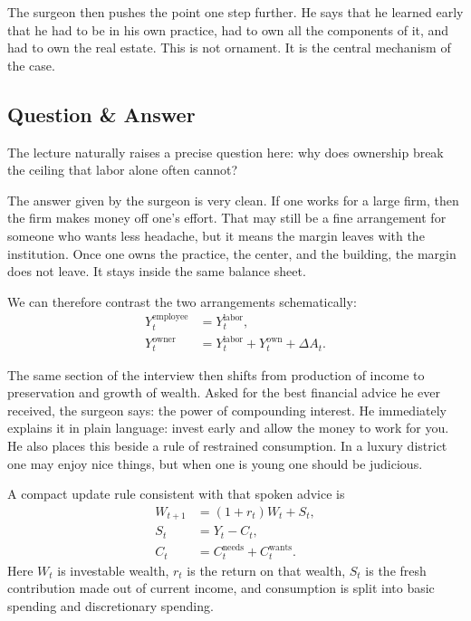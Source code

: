 The surgeon then pushes the point one step further. He says that he learned early that he had to be in his own practice, had to own all the components of it, and had to own the real estate. This is not ornament. It is the central mechanism of the case.

\subsection{Question \& Answer}

The lecture naturally raises a precise question here: why does ownership break the ceiling that labor alone often cannot?

The answer given by the surgeon is very clean. If one works for a large firm, then the firm makes money off one's effort. That may still be a fine arrangement for someone who wants less headache, but it means the margin leaves with the institution. Once one owns the practice, the center, and the building, the margin does not leave. It stays inside the same balance sheet.

We can therefore contrast the two arrangements schematically:
\begin{align}
Y_t^{\text{employee}} &= Y_t^{\text{labor}},\\
Y_t^{\text{owner}} &= Y_t^{\text{labor}} + Y_t^{\text{own}} + \Delta A_t.
\end{align}

The same section of the interview then shifts from production of income to preservation and growth of wealth. Asked for the best financial advice he ever received, the surgeon says: the power of compounding interest. He immediately explains it in plain language: invest early and allow the money to work for you. He also places this beside a rule of restrained consumption. In a luxury district one may enjoy nice things, but when one is young one should be judicious.

A compact update rule consistent with that spoken advice is
\begin{align}
W_{t+1} &= (1+r_t)W_t + S_t,\\
S_t &= Y_t - C_t,\\
C_t &= C_t^{\text{needs}} + C_t^{\text{wants}}.
\end{align}
Here \(W_t\) is investable wealth, \(r_t\) is the return on that wealth, \(S_t\) is the fresh contribution made out of current income, and consumption is split into basic spending and discretionary spending.

